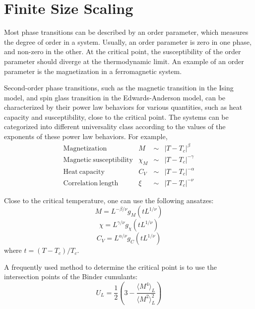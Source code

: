 \section{Finite Size Scaling}
Most phase transitions can be described by an order parameter, which measures
the degree of order in a system. Usually, an order parameter is zero in one phase,
and non-zero in the other. At the critical point, the susceptibility of the order
parameter should diverge at the thermodynamic limit. An example of an order parameter is the 
magnetization in a ferromagnetic system. 
 
Second-order phase transitions, such as the magnetic transition in the Ising model, and 
spin glass transition in the Edwards-Anderson model, can be characterized by their 
power law behaviors for various quantities, such as heat capacity and susceptibility,  
close to the critical point. The systems can be categorized into different universality 
class according to the values of the exponents of these power law behaviors. For example, 
\begin{equation}
  \label{eq:20}
  \begin{array}{lrcl}
    \mathrm{Magnetization}& M& \sim& \left|T-T_c\right|^\beta\\
    \mathrm{Magnetic~susceptibility}& \chi_M& \sim& \left|T-T_c\right|^{-\gamma}\\
    \mathrm{Heat~capacity}& C_V& \sim& \left|T-T_c\right|^{-\alpha}\\
    \mathrm{Correlation~length}& \xi& \sim& \left|T-T_c\right|^{-\nu}
  \end{array}
\end{equation}

Close to the critical temperature, one can use the following ansatzes:
\begin{equation}
  \label{eq:17}
  M=L^{-\beta/\nu}g_M(tL^{1/\nu})
\end{equation}
\begin{equation}
  \label{eq:19}
  \chi=L^{\gamma/\nu}g_\chi(tL^{1/\nu})
\end{equation}
\begin{equation}
  \label{eq:18}
  C_V=L^{\alpha/\nu}g_C(tL^{1/\nu})
\end{equation}
where $t=(T-T_c)/T_c$.

A frequently used method to determine the critical point is to use
the intersection points of the Binder cumulants:
\begin{equation}
  \label{eq:14}
  U_L=\frac{1}{2}\left(3-\frac{\langle M^4\rangle_L}{\langle M^2\rangle^2_L}\right)
\end{equation}

